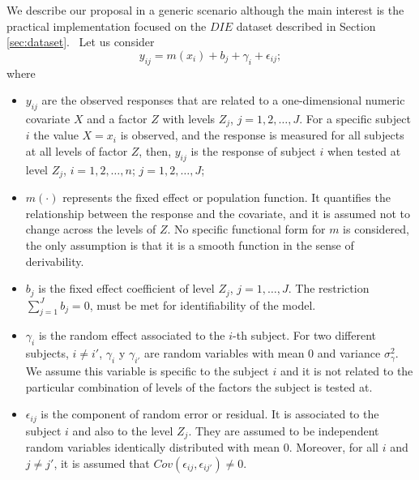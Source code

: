 \documentclass[sn-mathphys]{sn-jnl}%
\theoremstyle{thmstyleone}%
\theoremstyle{thmstyletwo}%
\theoremstyle{thmstylethree}%
\begin{document}
\noindent We describe our proposal in a generic scenario although the main interest is the practical implementation  focused on the $DIE$ dataset described in Section \ref{sec:dataset}.\ %
Let us consider 
\begin{equation} \label{eq:mix_model}
	y_{ij} = m(x_i)+ b_{j}+\gamma_{i}+ \epsilon_{ij};
\end{equation}
where 
\begin{itemize}
\item $y_{ij}$ are the observed responses that are related to a one-dimensional numeric covariate $X$ and a factor $Z$ with levels $Z_j$, $j=1,2,\ldots, J$. For a specific subject $i$ the value  $X=x_i$ is observed, and the response is measured for all subjects at all levels of factor $Z$, then, $y_{ij}$ is the response of subject $i$ when tested at level $Z_j$, $i=1,2,\ldots, n$; $j=1,2,\ldots, J$;

\item $m(\cdot)$ represents the fixed effect or population function. It quantifies the relationship between the response and the covariate, and it is assumed not to change across the levels of $Z$. No specific functional form for $m$ is considered, the only assumption is that it is a smooth function in the sense of derivability. 

\item $b_j$ is the fixed effect coefficient of level $Z_j$, $j=1, \ldots, J$. The restriction $\sum_{j=1}^J b_j=0$, must be met for identifiability of the model.

\item $\gamma_i$  is the random effect associated to the $i$-th subject. For two different subjects, $i \neq i'$, $\gamma_i$ y $\gamma_{i'}$ are random variables with mean 0 and variance  $\sigma_{\gamma}^2$. We assume this variable is specific to the  subject $i$ and it is not related to the particular combination of levels of the factors the subject is tested at. 


\item $\epsilon_{ij}$ is the component of random error or residual. It is associated to the subject $i$ and also to the level $Z_j$. They are assumed to be independent random variables identically distributed with mean 0. %
Moreover, for all $i$ and $j\neq j'$, it is assumed that $Cov(\epsilon_{ij},\epsilon_{ij'})\neq 0$.
\end{itemize}
\end{document}
